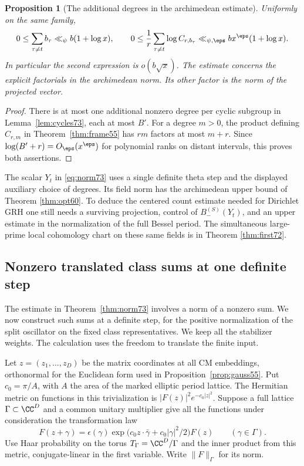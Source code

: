 \documentclass[a4paper,11pt]{article}
\newtheorem{proposition}{Proposition}[section]
\theoremstyle{definition}
\theoremstyle{remark}
\numberwithin{equation}{section}
\begin{document}
\begin{proposition}[The additional degrees in the archimedean estimate]\leavevmode\label{prop:cost73}
Uniformly on the same family,
\[
  0\le\sum_{\tau\ne t} b_\tau\ll_\psi b(1+\log x),\qquad
  0\le\frac1r\sum_{\tau\ne t}\log C_{r,b_\tau}
                     \ll_{\psi,\eps} b x^\eps(1+\log x).
\]
In particular the second expression is \(o(b\sqrt x)\).
The estimate concerns the explicit factorials in the
archimedean norm. Its other factor is the norm of the projected vector.
\end{proposition}
\begin{proof}
There is at most one additional nonzero degree per cyclic
subgroup in Lemma~\ref{lem:cycles73}, each at most \(B'\).
For a degree \(m>0\), the product defining \(C_{r,m}\) in
Theorem~\ref{thm:frame55} has \(rm\) factors at most \(m+r\).
Since \(\log(B'+r)=O_\eps(x^\eps)\) for polynomial ranks
on distant intervals, this proves both assertions.
\end{proof}

The scalar \(Y_t\) in \eqref{eq:norm73} uses a single definite
theta step and the displayed auxiliary choice of degrees. Its
field norm has the archimedean upper bound of
Theorem \ref{thm:opt60}.
To deduce the centered count estimate needed for Dirichlet GRH
one still needs a surviving projection, control of
\(B_-^{(S)}(Y_t)\), and an upper estimate in the normalization
of the full Bessel period. The simultaneous large-prime local
cohomology chart on these same fields is in
Theorem \ref{thm:first72}.

\subsection{Nonzero translated class sums at one definite step}\label{nav:V-18}
\label{sec:mean74}

The estimate in Theorem~\ref{thm:norm73} involves a norm of a
nonzero sum. We now construct such sums at a definite step, for
the positive normalization of the split oscillator on the fixed
class representatives. We keep all the stabilizer weights. The
calculation uses the freedom to translate the finite input.

Let \(z=(z_1,\ldots,z_D)\) be the matrix coordinates at all
CM embeddings, orthonormal for the Euclidean form used in
Proposition~\ref{prop:gauss55}. Put \(c_0=\pi/A\), with
\(A\) the area of the marked elliptic period lattice.
The Hermitian metric on functions in this trivialization is
\(|F(z)|^2e^{-c_0|z|^2}\). Suppose a full lattice
\(\Gamma\subset\CC^D\) and a common unitary multiplier give
all the functions under consideration the transformation law
\[
 F(z+\gamma)=\epsilon(\gamma)
   \exp\big(c_0 z\cdot\bar\gamma+c_0|\gamma|^2/2\big)F(z)
           \qquad(\gamma\in\Gamma).
\]
Use Haar probability on the torus \(T_\Gamma=\CC^D/\Gamma\)
and the inner product from this metric, conjugate-linear in
the first variable. Write \(\|F\|_\Gamma\) for its norm.
\end{document}
